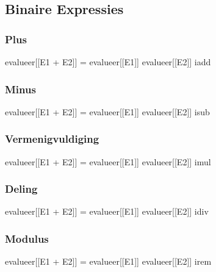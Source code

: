     \subsection{Binaire Expressies}
        \subsubsection{Plus}
        evalueer[[E1 + E2]] =
        evalueer[[E1]]
        evalueer[[E2]]
        iadd
        \subsubsection{Minus}
        evalueer[[E1 + E2]] =
        evalueer[[E1]]
        evalueer[[E2]]
        isub
        \subsubsection{Vermenigvuldiging}
        evalueer[[E1 + E2]] =
        evalueer[[E1]]
        evalueer[[E2]]
        imul
        \subsubsection{Deling}
        evalueer[[E1 + E2]] =
        evalueer[[E1]]
        evalueer[[E2]]
        idiv
        \subsubsection{Modulus}
        evalueer[[E1 + E2]] =
        evalueer[[E1]]
        evalueer[[E2]]
        irem


